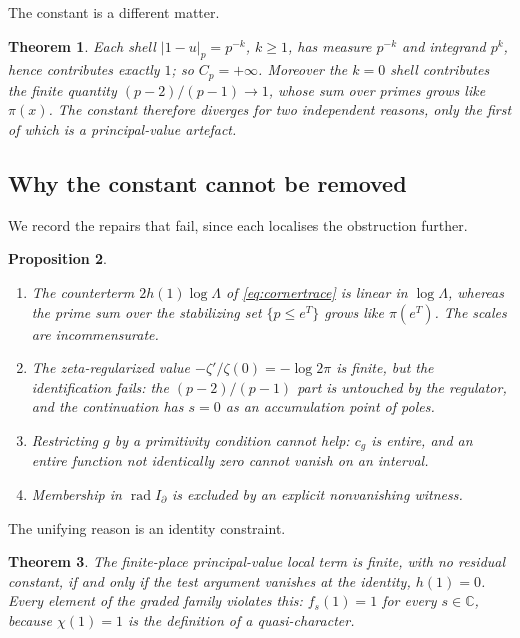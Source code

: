\documentclass[11pt]{amsart}
\newtheorem{theorem}{Theorem}[section]
\newtheorem{proposition}[theorem]{Proposition}
\theoremstyle{definition}
\theoremstyle{remark}
\newcommand{\C}{\mathbb C}
\begin{document}
The constant is a different matter.

\begin{theorem}\label{thm:constant}
Each shell $|1-u|_p=p^{-k}$, $k\ge1$, has measure $p^{-k}$ and integrand
$p^{k}$, hence contributes exactly $1$; so $C_p=+\infty$.  Moreover the
$k=0$ shell contributes the finite quantity $(p-2)/(p-1)\to1$, whose sum over
primes grows like $\pi(x)$.  The constant therefore diverges for two
independent reasons, only the first of which is a principal-value artefact.
\end{theorem}

\subsection{Why the constant cannot be removed}

We record the repairs that fail, since each localises the obstruction
further.

\begin{proposition}\label{prop:norepair}
\begin{enumerate}
\item The counterterm $2h(1)\log\Lambda$ of \eqref{eq:cornertrace} is linear
in $\log\Lambda$, whereas the prime sum over the stabilizing set
$\{p\le e^{T}\}$ grows like $\pi(e^{T})$.  The scales are incommensurate.
\item The zeta-regularized value $-\zeta'/\zeta(0)=-\log2\pi$ is finite, but
the identification fails: the $(p-2)/(p-1)$ part is untouched by the
regulator, and the continuation has $s=0$ as an accumulation point of poles.
\item Restricting $g$ by a primitivity condition cannot help: $c_g$ is
entire, and an entire function not identically zero cannot vanish on an
interval.
\item Membership in $\operatorname{rad}I_\partial$ is excluded by an explicit
nonvanishing witness.
\end{enumerate}
\end{proposition}

The unifying reason is an identity constraint.

\begin{theorem}\label{thm:identity}
The finite-place principal-value local term is finite, with no residual
constant, if and only if the test argument vanishes at the identity,
$h(1)=0$.  Every element of the graded family violates this: $f_s(1)=1$ for
every $s\in\C$, because $\chi(1)=1$ is the definition of a quasi-character.
\end{theorem}
\end{document}
